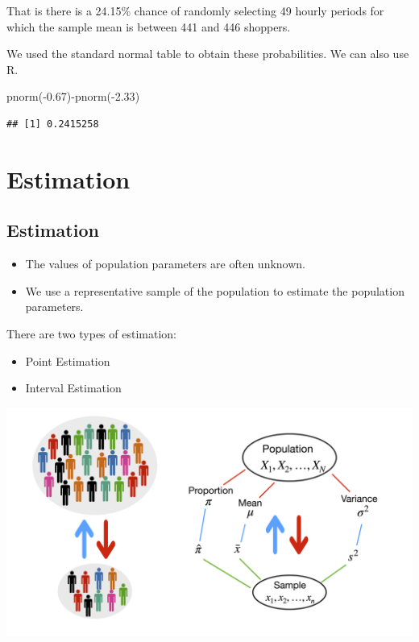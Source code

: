 \documentclass[
]{article}
\newcommand{\FloatTok}[1]{\textcolor[rgb]{0.00,0.00,0.81}{#1}}
\newcommand{\FunctionTok}[1]{\textcolor[rgb]{0.00,0.00,0.00}{#1}}
\newcommand{\NormalTok}[1]{#1}
\newcommand{\SpecialCharTok}[1]{\textcolor[rgb]{0.00,0.00,0.00}{#1}}
\providecommand{\tightlist}{%
  \setlength{\itemsep}{0pt}\setlength{\parskip}{0pt}}
\begin{document}
That is there is a 24.15\% chance of randomly selecting 49 hourly
periods for which the sample mean is between 441 and 446 shoppers.

We used the standard normal table to obtain these probabilities. We can
also use R.

\begin{Highlighting}[]
\FunctionTok{pnorm}\NormalTok{(}\SpecialCharTok{{-}}\FloatTok{0.67}\NormalTok{)}\SpecialCharTok{{-}}\FunctionTok{pnorm}\NormalTok{(}\SpecialCharTok{{-}}\FloatTok{2.33}\NormalTok{)}
\end{Highlighting}

\begin{verbatim}
## [1] 0.2415258
\end{verbatim}

\pagebreak

\hypertarget{estimation}{%
\section{Estimation}\label{estimation}}

\hypertarget{estimation-1}{%
\subsection{Estimation}\label{estimation-1}}

\begin{itemize}
\tightlist
\item
  The values of population parameters are often unknown.
\item
  We use a representative sample of the population to estimate the
  population parameters.
\end{itemize}

There are two types of estimation:

\begin{itemize}
\tightlist
\item
  Point Estimation
\item
  Interval Estimation
\end{itemize}

\begin{center}\includegraphics[width=1\linewidth,height=1\textheight]{stat1new} \end{center}
\end{document}
